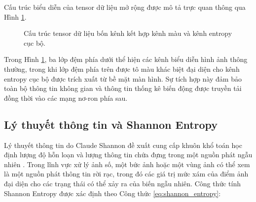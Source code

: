 Cấu trúc biểu diễn của tensor dữ liệu mở rộng được mô tả trực quan thông qua Hình \ref{fig:four_channel_structure}.

\begin{figure}[h!]
\centering
{}
\caption{Cấu trúc tensor dữ liệu bốn kênh kết hợp kênh màu và kênh entropy cục bộ.}
\label{fig:four_channel_structure}
\end{figure}

Trong Hình \ref{fig:four_channel_structure}, ba lớp đệm phía dưới thể hiện các kênh biểu diễn hình ảnh thông thường, trong khi lớp đệm phía trên được tô màu khác biệt đại diện cho kênh entropy cục bộ được trích xuất từ bề mặt màn hình. Sự tích hợp này đảm bảo toàn bộ thông tin không gian và thông tin thống kê biến động được truyền tải đồng thời vào các mạng nơ-ron phía sau.

\subsection{Lý thuyết thông tin và Shannon Entropy}

Lý thuyết thông tin do Claude Shannon đề xuất cung cấp khuôn khổ toán học định lượng độ hỗn loạn và lượng thông tin chứa đựng trong một nguồn phát ngẫu nhiên \cite{shannon1948mathematical}. Trong lĩnh vực xử lý ảnh số, một bức ảnh hoặc một vùng ảnh có thể xem là một nguồn phát thông tin rời rạc, trong đó các giá trị mức xám của điểm ảnh đại diện cho các trạng thái có thể xảy ra của biến ngẫu nhiên. Công thức tính Shannon Entropy được xác định theo Công thức \ref{eq:shannon_entropy}:


